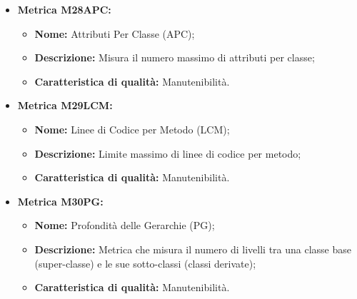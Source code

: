 \begin{itemize}
        \item \hypertarget{item:M28APC}{\textbf{Metrica M28APC:}}
        \begin{minipage}[t]{0.9\textwidth}
          \begin{itemize}
              \item \textbf{Nome:} Attributi Per Classe (APC);
              \item \textbf{Descrizione:} Misura il numero massimo di attributi per classe;
              \item \textbf{Caratteristica di qualità:} Manutenibilità.
          \end{itemize} 
        \end{minipage}

          \item \hypertarget{item:M29LCM}{\textbf{Metrica M29LCM:}}
          \begin{minipage}[t]{0.9\textwidth}
          \begin{itemize}
              \item \textbf{Nome:} Linee di Codice per Metodo (LCM);
              \item \textbf{Descrizione:} Limite massimo di linee di codice per metodo;
              \item \textbf{Caratteristica di qualità:} Manutenibilità.
          \end{itemize}
         \end{minipage} 

          \item \hypertarget{item:M30PG}{\textbf{Metrica M30PG:}}
          \begin{minipage}[t]{0.9\textwidth}
            \begin{itemize}
              \item \textbf{Nome:} Profondità delle Gerarchie (PG);
              \item \textbf{Descrizione:} Metrica che misura il numero di livelli tra una classe base (super-classe) e le sue sotto-classi (classi derivate);
              \item \textbf{Caratteristica di qualità:} Manutenibilità.
           \end{itemize} 
          \end{minipage}


\end{itemize}
